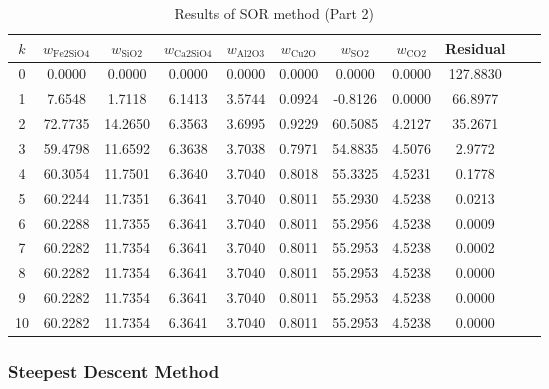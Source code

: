 \documentclass[10pt]{article}
\begin{document}
\begin{table}[htbp]
\centering
\caption{Results of SOR method (Part 2)}
\begin{tabular}{ccccccccccc}
\toprule
\( k \) & \( w_{\text{Fe2SiO4}} \) & \( w_{\text{SiO2}} \) & \( w_{\text{Ca2SiO4}} \) & \( w_{\text{Al2O3}} \) & \( w_{\text{Cu2O}} \) & \( w_{\text{SO2}} \) & \( w_{\text{CO2}} \) & Residual \\
\midrule
0 & 0.0000 & 0.0000 & 0.0000 & 0.0000 & 0.0000 & 0.0000 & 0.0000 & 127.8830 \\
1 & 7.6548 & 1.7118 & 6.1413 & 3.5744 & 0.0924 & -0.8126 & 0.0000 & 66.8977 \\
2 & 72.7735 & 14.2650 & 6.3563 & 3.6995 & 0.9229 & 60.5085 & 4.2127 & 35.2671 \\
3 & 59.4798 & 11.6592 & 6.3638 & 3.7038 & 0.7971 & 54.8835 & 4.5076 & 2.9772 \\
4 & 60.3054 & 11.7501 & 6.3640 & 3.7040 & 0.8018 & 55.3325 & 4.5231 & 0.1778 \\
5 & 60.2244 & 11.7351 & 6.3641 & 3.7040 & 0.8011 & 55.2930 & 4.5238 & 0.0213 \\
6 & 60.2288 & 11.7355 & 6.3641 & 3.7040 & 0.8011 & 55.2956 & 4.5238 & 0.0009 \\
7 & 60.2282 & 11.7354 & 6.3641 & 3.7040 & 0.8011 & 55.2953 & 4.5238 & 0.0002 \\
8 & 60.2282 & 11.7354 & 6.3641 & 3.7040 & 0.8011 & 55.2953 & 4.5238 & 0.0000 \\
9 & 60.2282 & 11.7354 & 6.3641 & 3.7040 & 0.8011 & 55.2953 & 4.5238 & 0.0000 \\
10 & 60.2282 & 11.7354 & 6.3641 & 3.7040 & 0.8011 & 55.2953 & 4.5238 & 0.0000 \\
\bottomrule
\end{tabular}
\end{table}


\subsubsection{Steepest Descent Method}
\end{document}
